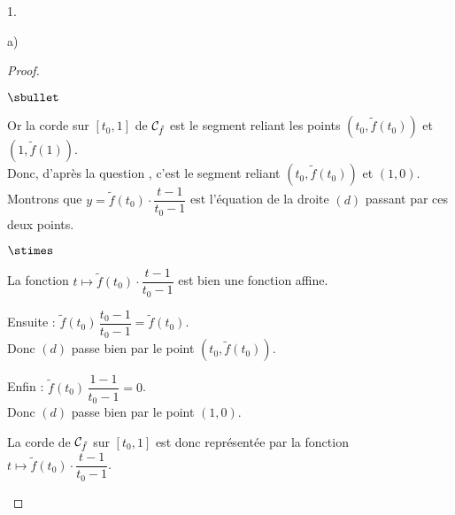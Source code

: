 \documentclass[11pt]{article}%
\begin{document}
\begin{noliste}{1.}
\begin{noliste}{a)}
\begin{proof}
\begin{noliste}{$\sbullet$}
      \item Or la corde sur $[t_0,1]$ de ${\cal C}_{\tilde{f}}$ est le 
      segment 
      reliant les points $(t_0,\tilde{f}(t_0))$ et $(1,\tilde{f}(1))$.\\
      Donc, d'après la question , c'est le segment reliant 
      $(t_0,\tilde{f}(t_0))$ et $(1,0)$.\\
      Montrons que $y= \tilde{f}(t_0) \cdot \dfrac{t-1}{t_0-1}$ est 
      l'équation de la droite $(d)$ passant par ces deux points.
      \begin{noliste}{$\stimes$}
        \item La fonction $t\mapsto \tilde{f}(t_0) \cdot 
	\dfrac{t-1}{t_0-1}$ est bien une fonction affine.
        \item Ensuite : $\tilde{f}(t_0) \, \dfrac{t_0-1}{t_0-1} = 
        \tilde{f}(t_0)$.\\[.1cm]
        Donc $(d)$ passe bien 
        par le point $(t_0,\tilde{f}(t_0))$.
        \item Enfin : $\tilde{f}(t_0) \, \dfrac{1-1}{t_0-1} = 
	0$.\\[.1cm]
        Donc $(d)$ 
        passe bien par le point $(1,0)$.
      \end{noliste}
      La corde de ${\cal C}_{\tilde{f}}$ sur $[t_0,1]$ est donc 
      représentée par la fonction $t \mapsto \tilde{f}(t_0) \cdot
      \dfrac{t-1}{t_0-1}$.
% 
%       
%       
%       
%       
%       
%       

\end{noliste}
\end{proof}
\end{noliste}
\end{noliste}
\end{document}
